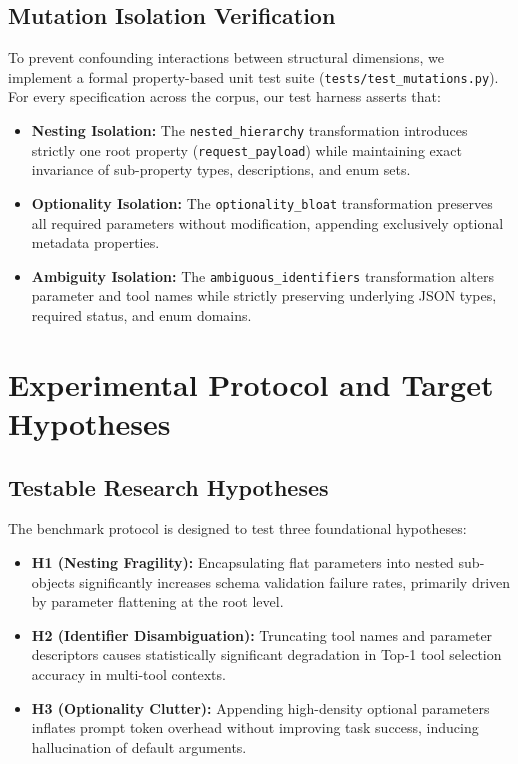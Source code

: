 \documentclass[10pt,conference]{IEEEtran}
\begin{document}
\subsection{Mutation Isolation Verification}
To prevent confounding interactions between structural dimensions, we implement a formal property-based unit test suite (\texttt{tests/test\_mutations.py}). For every specification across the corpus, our test harness asserts that:
\begin{itemize}
    \item \textbf{Nesting Isolation:} The \texttt{nested\_hierarchy} transformation introduces strictly one root property (\texttt{request\_payload}) while maintaining exact invariance of sub-property types, descriptions, and enum sets.
    \item \textbf{Optionality Isolation:} The \texttt{optionality\_bloat} transformation preserves all required parameters without modification, appending exclusively optional metadata properties.
    \item \textbf{Ambiguity Isolation:} The \texttt{ambiguous\_identifiers} transformation alters parameter and tool names while strictly preserving underlying JSON types, required status, and enum domains.
\end{itemize}

\section{Experimental Protocol and Target Hypotheses}

\subsection{Testable Research Hypotheses}
The benchmark protocol is designed to test three foundational hypotheses:
\begin{itemize}
    \item \textbf{H1 (Nesting Fragility):} Encapsulating flat parameters into nested sub-objects significantly increases schema validation failure rates, primarily driven by parameter flattening at the root level.
    \item \textbf{H2 (Identifier Disambiguation):} Truncating tool names and parameter descriptors causes statistically significant degradation in Top-1 tool selection accuracy in multi-tool contexts.
    \item \textbf{H3 (Optionality Clutter):} Appending high-density optional parameters inflates prompt token overhead without improving task success, inducing hallucination of default arguments.
\end{itemize}
\end{document}
